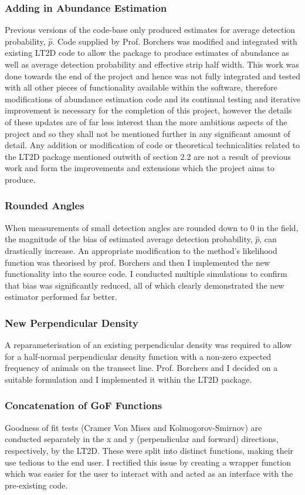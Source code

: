 \documentclass[11pt]{article}
\begin{document}
\begin{multicols}{2}
\subsubsection{Adding in Abundance Estimation}
Previous versions of the code-base only produced estimates for average detection probability, $\hat{p}$. Code supplied by Prof. Borchers was modified and integrated with existing LT2D code to allow the package to produce estimates of abundance as well as average detection probability and effective strip half width. This work was done towards the end of the project and hence was not fully integrated and tested with all other pieces of functionality available within the software, therefore modifications of abundance estimation code and its continual testing and iterative improvement is necessary for the completion of this project, however the details of these updates are of far less interest than the more ambitious aspects of the project and so they shall not be mentioned further in any significant amount of detail. Any addition or modification of code or theoretical technicalities related to the LT2D package mentioned outwith of section 2.2 are not a result of previous work and form the improvements and extensions which the project aims to produce.

\subsubsection{Rounded Angles}
When measurements of small detection angles are rounded down to $0$ in the field, the magnitude of the bias of estimated average detection probability, $\hat{p}$, can drastically increase. An appropriate modification to the method's likelihood function was theorised by prof. Borchers and then I implemented the new functionality into the source code. I conducted multiple simulations to confirm that bias was significantly reduced, all of which clearly demonstrated the new estimator performed far better.

\subsubsection{New Perpendicular Density}
A reparameterisation of an existing perpendicular density was required to allow for a  half-normal perpendicular density function with a non-zero expected frequency of animals on the transect line. Prof. Borchers and I decided on a suitable formulation and I implemented it within the LT2D package. 

\subsubsection{Concatenation of GoF Functions}
Goodness of fit tests (Cramer Von Mises and Kolmogorov-Smirnov) are conducted separately in the x and y (perpendicular and forward) directions, respectively, by the LT2D. These were split into distinct functions, making their use tedious to the end user. I rectified this issue by creating a wrapper function which was easier for the user to interact with and acted as an interface with the pre-existing code.


\end{multicols}
\end{document}
